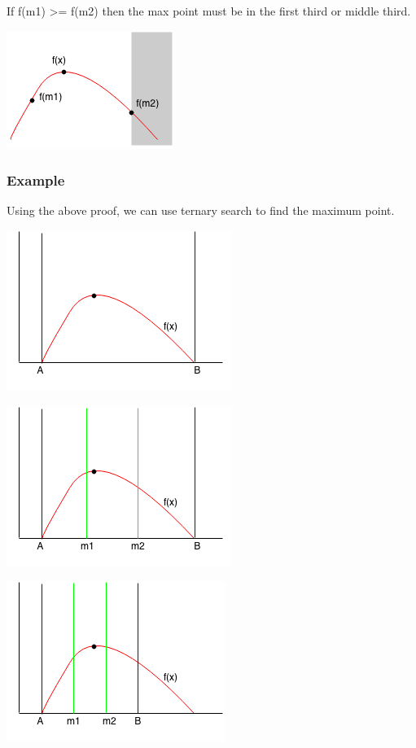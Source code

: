 \documentclass[11pt,oneside]{book}
\makeatletter
\def\maxwidth#1{\ifdim\Gin@nat@width>#1 #1\else\Gin@nat@width\fi}
\makeatother
\begin{document}
If f(m1) >= f(m2) then the max point must be in the first third or middle third.

\includegraphics[width=\maxwidth{\textwidth}]{ternarycase2.png}

\subsubsection{Example}

Using the above proof, we can use ternary search to find the maximum point.

\includegraphics[width=\maxwidth{\textwidth}]{ternarysearch.png}

\includegraphics[width=\maxwidth{\textwidth}]{ternarysearch2.png}

\includegraphics[width=\maxwidth{\textwidth}]{ternarysearch3.png}
\end{document}
